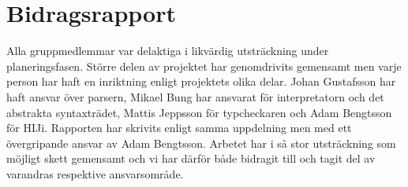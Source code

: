 \appendix
\section{Bidragsrapport}
Alla gruppmedlemmar var delaktiga i likvärdig utsträckning under planeringsfasen. Större delen av projektet har genomdrivits gemensamt men varje person har haft en inriktning enligt projektets olika delar. Johan Gustafsson har haft ansvar över parsern, Mikael Bung har ansvarat för interpretatorn och det abstrakta syntaxträdet, Mattis Jeppsson för typcheckaren och Adam Bengtsson för HIJi. Rapporten har skrivits enligt samma uppdelning men med ett övergripande ansvar av Adam Bengtsson. Arbetet har i så stor utsträckning som möjligt skett gemensamt och vi har därför både bidragit till och tagit del av varandras respektive ansvarsområde. 
